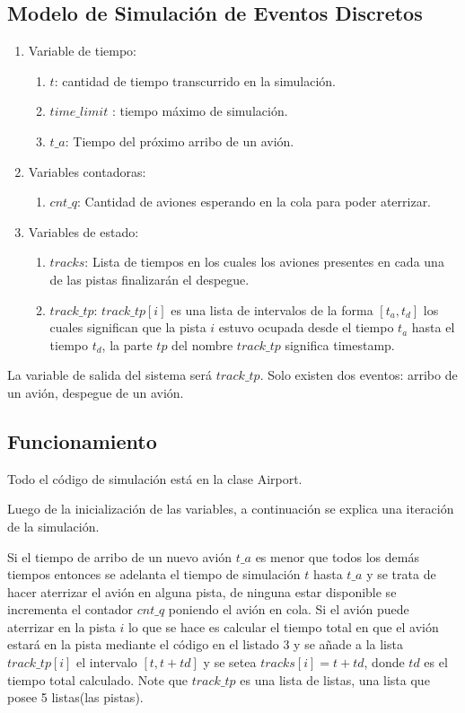 \documentclass[12pt,letterpaper]{article}
\begin{document}
\subsection*{Modelo de Simulación de Eventos Discretos}
\begin{enumerate}
	\item Variable de tiempo: 
		\begin{enumerate}
			\item $t$: cantidad de tiempo transcurrido en la simulaci\'on.
			\item $time\_limit$ : tiempo m\'aximo de simulaci\'on.
			\item $t\_a$: Tiempo del pr\'oximo arribo de un avi\'on.
		\end{enumerate}
	 
	\item Variables contadoras:
		\begin{enumerate}
			\item $cnt\_q$: Cantidad de aviones esperando en la cola para poder aterrizar. 
		\end{enumerate}
	\item Variables de estado:
		\begin{enumerate}
			\item $tracks$: Lista de tiempos en los cuales los aviones presentes en cada una de las pistas finalizar\'an el despegue.
			\item $track\_tp$: $track\_tp[i]$ es una lista de intervalos de la forma $[t_a, t_d]$ los cuales significan que la pista $i$ estuvo ocupada desde el tiempo $t_a$ hasta el tiempo $t_d$, la parte $tp$ del nombre $track\_tp$ significa timestamp.
		\end{enumerate}
\end{enumerate}

La variable de salida del sistema ser\'a  $track\_tp$. Solo existen dos eventos: arribo de un avi\'on, despegue de un avi\'on.
\subsection*{Funcionamiento}

Todo el c\'odigo de simulaci\'on est\'a en la clase Airport.

Luego de la inicializaci\'on de las variables, a continuaci\'on se explica una iteraci\'on de la simulaci\'on. 

Si el tiempo de arribo de un nuevo avi\'on $t\_a$ es menor que todos los dem\'as tiempos entonces se adelanta el tiempo de simulaci\'on $t$ hasta $t\_a$ y se trata de hacer aterrizar el avi\'on en alguna pista, de ninguna estar disponible se incrementa el contador $cnt\_q$ poniendo el avi\'on en cola. Si el avi\'on puede aterrizar en la pista $i$ lo que se hace es calcular el tiempo  total en que el avi\'on estar\'a en la pista mediante el c\'odigo en el listado 3 y se añade a la lista $track\_tp[i]$ el intervalo $[t, t + td]$ y se setea $tracks[i] = t + td$, donde $td$ es el tiempo total calculado. Note que $track\_tp$ es una lista de listas, una lista que posee 5 listas(las pistas).
\end{document}
